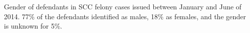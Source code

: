 Gender of defendants in SCC felony cases issued between January and June of 2014. 77\% of the defendants identified as males, 18\% as females, and the gender is unknown for 5\%.
\label{fig:GenderBreakdown}